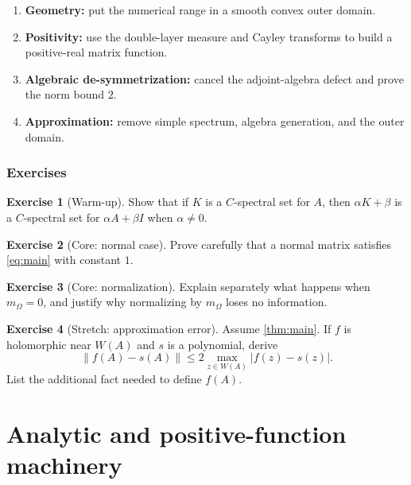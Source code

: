 \documentclass[11pt,oneside,openany]{book}
\theoremstyle{definition}
\newtheorem{exercise}{Exercise}[chapter]
\theoremstyle{remark}
\newcommand{\norm}[1]{\left\lVert #1\right\rVert}
\begin{document}
\begin{proofmap}
\begin{enumerate}
  \item \textbf{Geometry:} put the numerical range in a smooth convex
  outer domain.
  \item \textbf{Positivity:} use the double-layer measure and Cayley
  transforms to build a positive-real matrix function.
  \item \textbf{Algebraic de-symmetrization:} cancel the adjoint-algebra
  defect and prove the norm bound \(2\).
  \item \textbf{Approximation:} remove simple spectrum, algebra
  generation, and the outer domain.
\end{enumerate}
\end{proofmap}

\section{Exercises}

\begin{exercise}[Warm-up]
Show that if \(K\) is a \(C\)-spectral set for \(A\), then
\(\alpha K+\beta\) is a \(C\)-spectral set for \(\alpha A+\beta I\)
when \(\alpha\neq0\).
\end{exercise}

\begin{exercise}[Core: normal case]
Prove carefully that a normal matrix satisfies \eqref{eq:main} with
constant \(1\).
\end{exercise}

\begin{exercise}[Core: normalization]
Explain separately what happens when \(m_\Omega=0\), and justify why
normalizing by \(m_\Omega\) loses no information.
\end{exercise}

\begin{exercise}[Stretch: approximation error]
Assume \cref{thm:main}.  If \(f\) is holomorphic near \(W(A)\) and \(s\)
is a polynomial, derive
\[
  \norm{f(A)-s(A)}
  \leq2\max_{z\in W(A)}|f(z)-s(z)|.
\]
List the additional fact needed to define \(f(A)\).
\end{exercise}

\part{Analytic and positive-function machinery}
\end{document}
